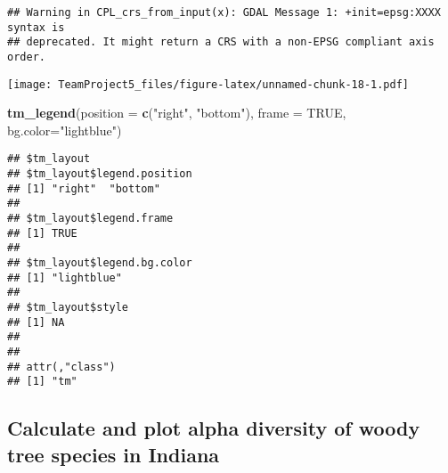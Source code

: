 \documentclass[
]{article}
\newenvironment{Shaded}{\begin{snugshade}}{\end{snugshade}}
\newcommand{\DataTypeTok}[1]{\textcolor[rgb]{0.13,0.29,0.53}{#1}}
\newcommand{\KeywordTok}[1]{\textcolor[rgb]{0.13,0.29,0.53}{\textbf{#1}}}
\newcommand{\NormalTok}[1]{#1}
\newcommand{\OtherTok}[1]{\textcolor[rgb]{0.56,0.35,0.01}{#1}}
\newcommand{\StringTok}[1]{\textcolor[rgb]{0.31,0.60,0.02}{#1}}
\begin{document}
\begin{verbatim}
## Warning in CPL_crs_from_input(x): GDAL Message 1: +init=epsg:XXXX syntax is
## deprecated. It might return a CRS with a non-EPSG compliant axis order.
\end{verbatim}

\texttt{[image: TeamProject5\_files/figure-latex/unnamed-chunk-18-1.pdf]}

\begin{Shaded}
\begin{Highlighting}[]
\KeywordTok{tm_legend}\NormalTok{(}\DataTypeTok{position =} \KeywordTok{c}\NormalTok{(}\StringTok{"right"}\NormalTok{, }\StringTok{"bottom"}\NormalTok{), }
    \DataTypeTok{frame =} \OtherTok{TRUE}\NormalTok{,}
    \DataTypeTok{bg.color=}\StringTok{"lightblue"}\NormalTok{)}
\end{Highlighting}
\end{Shaded}

\begin{verbatim}
## $tm_layout
## $tm_layout$legend.position
## [1] "right"  "bottom"
## 
## $tm_layout$legend.frame
## [1] TRUE
## 
## $tm_layout$legend.bg.color
## [1] "lightblue"
## 
## $tm_layout$style
## [1] NA
## 
## 
## attr(,"class")
## [1] "tm"
\end{verbatim}

\hypertarget{calculate-and-plot-alpha-diversity-of-woody-tree-species-in-indiana}{%
\subsection{Calculate and plot alpha diversity of woody tree species in
Indiana}\label{calculate-and-plot-alpha-diversity-of-woody-tree-species-in-indiana}}
\end{document}
